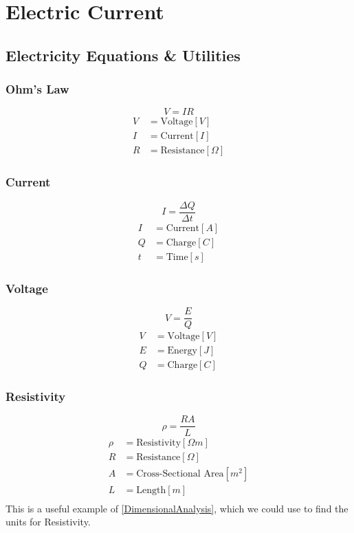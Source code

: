 \chapter{Electric Current}
\section{Electricity Equations \& Utilities}
\subsection{Ohm's Law}
\[ V = IR \] \label{Eq_OhmsLaw}
\begin{align}
	V &= \text{Voltage} \left[ V \right] \\
	I &= \text{Current} \left[ I \right] \\
	R &= \text{Resistance} \left[ \Omega \right] 
\end{align}

\subsection{Current}
\[ I = \frac{\Delta Q}{\Delta t} \] \label{Eq_Current}
\begin{align}
	I &= \text{Current} \left[ A \right] \\
	Q &= \text{Charge} \left[ C \right] \\
	t &= \text{Time} \left[ s \right] 
\end{align}

\subsection{Voltage}
\[ V = \frac{E}{Q} \] \label{Eq_Voltage}
\begin{align}
	V &= \text{Voltage} \left[ V \right] \\
	E &= \text{Energy} \left[ J \right]  \\
	Q &= \text{Charge} \left[ C \right]
\end{align}

\subsection{Resistivity}
\[\rho = \frac{RA}{L}\]
\begin{align}
	\rho &= \text{Resistivity} \left[ \Omega m \right] \\
	R &= \text{Resistance} \left[ \Omega \right] \\
	A &= \text{Cross-Sectional Area} \left[ m^2 \right] \\
	L &= \text{Length} \left[ m \right] \\
\end{align}
This is a useful example of \eqref{DimensionalAnalysis}, which we could use to find the units for Resistivity.

